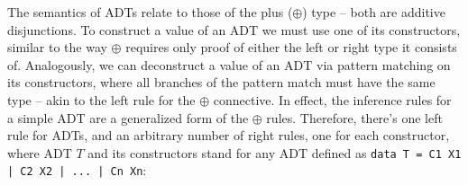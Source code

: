 \documentclass{llncs}
\begin{document}
The semantics of ADTs relate to those of the plus ($\oplus$) type -- both are
additive disjunctions.  To construct a value of an ADT we must use one of its
constructors, similar to the way $\oplus$ requires only proof of either the left
or right type it consists of. Analogously, we can deconstruct a value of an ADT
via pattern matching on its constructors, where all branches of the pattern
match must have the same type -- akin to the left rule for the $\oplus$
connective. In effect, the inference rules for a simple ADT are a generalized
form of the $\oplus$ rules.  Therefore, there's one left rule for ADTs, and an
arbitrary number of right rules, one for each constructor, where ADT $T$ and
its constructors stand for any ADT defined as \texttt{data T = C1
X1 | C2 X2 | ... | Cn Xn}:
%

\end{document}
